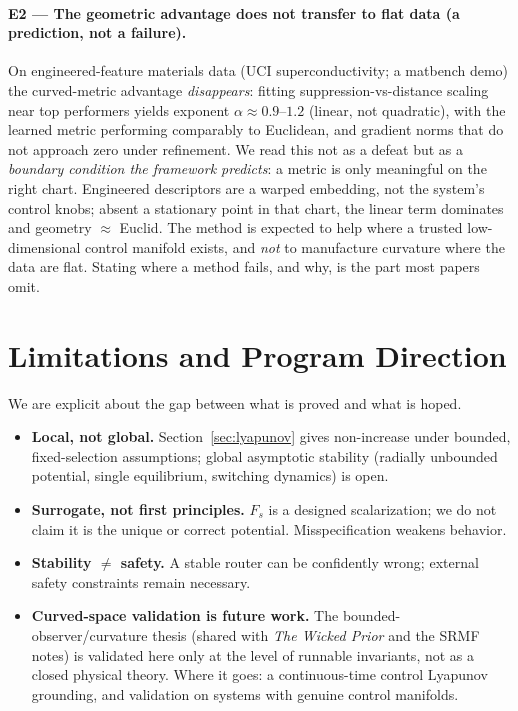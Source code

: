 \documentclass[11pt]{article}
\theoremstyle{plain}
\theoremstyle{definition}
\theoremstyle{remark}
\newcommand{\Fs}{F_{s}}
\begin{document}
\paragraph{E2 --- The geometric advantage does not transfer to flat data (a prediction,
not a failure).} On engineered-feature materials data (UCI superconductivity; a matbench demo)
the curved-metric advantage \emph{disappears}: fitting suppression-vs-distance scaling near
top performers yields exponent $\alpha\approx 0.9\text{--}1.2$ (linear, not quadratic), with
the learned metric performing comparably to Euclidean, and gradient norms that do not approach
zero under refinement. We read this not as a defeat but as a \emph{boundary condition the
framework predicts}: a metric is only meaningful on the right chart. Engineered descriptors are
a warped embedding, not the system's control knobs; absent a stationary point in that chart,
the linear term dominates and geometry $\approx$ Euclid. The method is expected to help where a
trusted low-dimensional control manifold exists, and \emph{not} to manufacture curvature where
the data are flat. Stating where a method fails, and why, is the part most papers omit.

\section{Limitations and Program Direction}\label{sec:limits}

We are explicit about the gap between what is proved and what is hoped.
\begin{itemize}[nosep]
\item \textbf{Local, not global.} Section~\ref{sec:lyapunov} gives non-increase under
bounded, fixed-selection assumptions; global asymptotic stability (radially unbounded
potential, single equilibrium, switching dynamics) is open.
\item \textbf{Surrogate, not first principles.} $\Fs$ is a designed scalarization; we do not
claim it is the unique or correct potential. Misspecification weakens behavior.
\item \textbf{Stability $\neq$ safety.} A stable router can be confidently wrong; external
safety constraints remain necessary.
\item \textbf{Curved-space validation is future work.} The bounded-observer/curvature thesis
(shared with \emph{The Wicked Prior} and the SRMF notes) is validated here only at the level of
runnable invariants, not as a closed physical theory. Where it goes: a continuous-time control
Lyapunov grounding, and validation on systems with genuine control manifolds.
\end{itemize}
\end{document}
